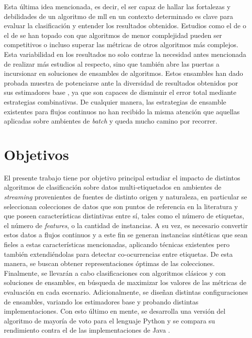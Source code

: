 Esta última idea mencionada, es decir, el ser capaz de hallar las fortalezas y
debilidades de un algoritmo de \acrshort{mll} en un contexto determinado es
clave para evaluar la clasificación y entender los resultados obtenidos.
Estudios como el de \citeauthor{sousa_multi-label_2018}
\cite{sousa_multi-label_2018} o el de \citeauthor{read_scalable_2012}
\cite{read_scalable_2012} se han topado con que algoritmos de menor complejidad
pueden ser competitivos o incluso superar las métricas de otros algoritmos más
complejos. Esta variabilidad en los resultados no solo contrae la necesidad
antes mencionada de realizar más estudios al respecto, sino que también abre las
puertas a incursionar en soluciones de ensambles de algoritmos. Estos ensambles
han dado probada muestra de potenciarse ante la diversidad de resultados
obtenidos por sus estimadores base \cite{polikar_polikar_2006}, ya que son
capaces de disminuir el error total mediante estrategias combinativas. De
cualquier manera, las estrategias de ensamble existentes para flujos continuos
no han recibido la misma atención que aquellas aplicadas sobre ambientes de
\textit{batch} y queda mucho camino por recorrer.



\section{Objetivos}

El presente trabajo tiene por objetivo principal
estudiar el impacto de distintos algoritmos de clasificación
sobre datos multi-etiquetados en ambientes de \textit{streaming} provenientes de
fuentes de distinto origen y naturaleza, en particular se
seleccionan colecciones de datos que son puntos de referencia en la literatura y
que poseen características distintivas entre sí, tales como el número de
etiquetas, el número de \textit{features}, o la cantidad de instancias. A su
vez, es necesario convertir estos datos a flujos continuos y a este fin se
generan instancias sintéticas que sean fieles a estas características
mencionadas, aplicando técnicas existentes pero también extendiéndolas para
detectar co-ocurrencias entre etiquetas. De esta manera, se buscan obtener
representaciones óptimas de las colecciones. Finalmente, se llevarán a cabo
clasificaciones con algoritmos clásicos y con soluciones de ensambles, en
búsqueda de maximizar los valores de las métricas de evaluación en cada
escenario. Adicionalmente, se diseñan distintas configuraciones de ensambles,
variando los estimadores base y probando distintas implementaciones. Con esto
último en mente, se desarrolla una versión del algoritmo de mayoría de voto
 para el lenguaje
Python  y se compara su rendimiento contra el de
las implementaciones de Java .

